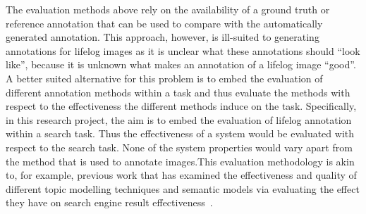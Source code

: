 \documentclass[12pt,a4paper]{article}
\begin{document}
The evaluation methods above rely on the availability of a ground truth or reference annotation that can be used to compare with the automatically generated annotation. This approach, however, is ill-suited to generating annotations for lifelog images as it is unclear what these annotations should ``look like'', because it is unknown what makes an annotation of a lifelog image ``good''. A better suited alternative for this problem is to embed the evaluation of different annotation methods within a task and thus evaluate the  methods with respect to the effectiveness the different methods induce on the task. Specifically, in this research project, the aim is to embed the evaluation of lifelog annotation within a search task. Thus the effectiveness of a system would be evaluated with respect to the search task. None of the system properties would vary apart from the method that is used to annotate images.This evaluation methodology is akin to, for example, previous work that has examined the effectiveness and quality of different topic modelling techniques and semantic models via evaluating the effect they have on search engine result effectiveness~\cite{wei2006lda,zuccon2015integrating,karimzadehgan2010estimation,yi2009comparative}.
\end{document}
